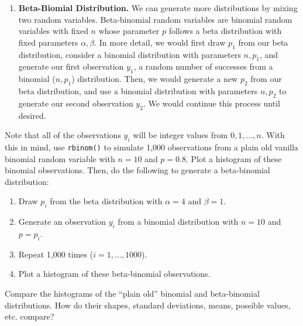 \documentclass[
]{krantz}
\providecommand{\tightlist}{%
  \setlength{\itemsep}{0pt}\setlength{\parskip}{0pt}}
\begin{document}
\begin{enumerate}
\def\labelenumi{\arabic{enumi}.}
\tightlist
\item
  \textbf{Beta-Biomial Distribution.} We can generate more distributions by mixing two random variables. Beta-binomial random variables are binomial random variables with fixed \(n\) whose parameter \(p\) follows a beta distribution with fixed parameters \(\alpha, \beta\). In more detail, we would first draw \(p_1\) from our beta distribution, consider a binomial distribution with parameters \(n, p_1\), and generate our first observation \(y_1\), a random number of successes from a binomial (\(n, p_1\)) distribution. Then, we would generate a new \(p_2\) from our beta distribution, and use a binomial distribution with parameters \(n, p_2\) to generate our second observation \(y_2\). We would continue this process until desired.
\end{enumerate}

Note that all of the observations \(y_i\) will be integer values from \(0, 1, \ldots, n\). With this in mind, use \texttt{rbinom()} to simulate 1,000 observations from a plain old vanilla binomial random variable with \(n=10\) and \(p=0.8\). Plot a histogram of these binomial observations.
Then, do the following to generate a beta-binomial distribution:

\begin{enumerate}
\def\labelenumi{\alph{enumi}.}
\tightlist
\item
  Draw \(p_i\) from the beta distribution with \(\alpha=4\) and \(\beta=1\).
\item
  Generate an observation \(y_i\) from a binomial distribution with \(n=10\) and \(p = p_i\).
\item
  Repeat 1,000 times (\(i=1,\ldots,1000\)).
\item
  Plot a histogram of these beta-binomial observations.
\end{enumerate}

Compare the histograms of the ``plain old'' binomial and beta-binomial distributions. How do their shapes, standard deviations, means, possible values, etc. compare?
\end{document}
